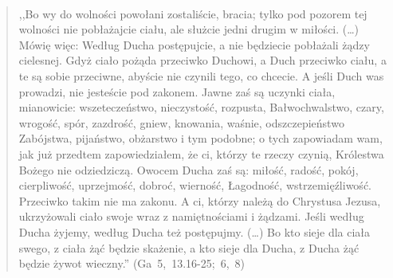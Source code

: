 \documentclass[10pt,a4paper,oneside]{article}
\begin{document}
\paragraph{}
\begin{quote}
,,Bo wy do wolności powołani zostaliście, bracia; tylko pod pozorem tej wolności nie pobłażajcie ciału, ale służcie jedni drugim w miłości. (\ldots) Mówię więc: Według Ducha postępujcie, a nie będziecie pobłażali żądzy cielesnej. Gdyż ciało pożąda przeciwko Duchowi, a Duch przeciwko ciału, a te są sobie przeciwne, abyście nie czynili tego, co chcecie. A jeśli Duch was prowadzi, nie jesteście pod zakonem. Jawne zaś są uczynki ciała, mianowicie: wszeteczeństwo, nieczystość, rozpusta, Bałwochwalstwo, czary, wrogość, spór, zazdrość, gniew, knowania, waśnie, odszczepieństwo Zabójstwa, pijaństwo, obżarstwo i tym podobne; o tych zapowiadam wam, jak już przedtem zapowiedziałem, że ci, którzy te rzeczy czynią, Królestwa Bożego nie odziedziczą. Owocem Ducha zaś są: miłość, radość, pokój, cierpliwość, uprzejmość, dobroć, wierność, Łagodność, wstrzemięźliwość. Przeciwko takim nie ma zakonu. A ci, którzy należą do Chrystusa Jezusa, ukrzyżowali ciało swoje wraz z namiętnościami i żądzami. Jeśli według Ducha żyjemy, według Ducha też postępujmy. (\ldots) Bo kto sieje dla ciała swego, z ciała żąć będzie skażenie, a kto sieje dla Ducha, z Ducha żąć będzie żywot wieczny.'' \mbox{(Ga 5, 13.16-25; 6, 8)}
\end{quote}
\end{document}
